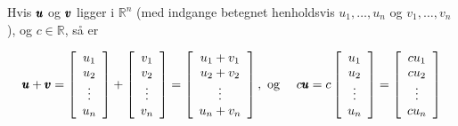 \begin{example}
    Hvis $\pmb{u}$ og $\pmb{v}$ ligger i $\mathbb{R}^n$ (med indgange betegnet henholdsvis $u_1, \ldots, u_n$ og $v_1, \ldots, v_n$), og $c \in \mathbb{R}$, så er

    \[
    \begin{aligned}
    & \pmb{u} + \pmb{v} = {\left[\begin{array}{c}
    u_1 \\
    u_2 \\
    \vdots \\
    u_n
    \end{array}\right] + \left[\begin{array}{c}
    v_1 \\
    v_2 \\
    \vdots \\
    v_n
    \end{array}\right] = \left[\begin{array}{c}
    u_1 + v_1 \\
    u_2 + v_2 \\
    \vdots \\
    u_n + v_n
    \end{array}\right], \text { og } } 
    & c \pmb{u} = c\left[\begin{array}{c}
    u_1 \\
    u_2 \\
    \vdots \\
    u_n
    \end{array}\right] = \left[\begin{array}{c}
    c u_1 \\
    c u_2 \\
    \vdots \\
    c u_n
    \end{array}\right]
    \end{aligned}
    \]   
\end{example}


